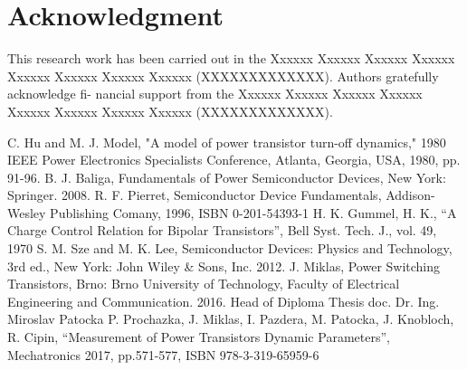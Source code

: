 \documentclass[conference]{IEEEtran}
\begin{document}


\section*{Acknowledgment}
This research work has been carried out in the Xxxxxx
Xxxxxx Xxxxxx Xxxxxx Xxxxxx Xxxxxx Xxxxxx Xxxxxx
(XXXXXXXXXXXXX). Authors gratefully acknowledge fi-
nancial support from the Xxxxxx Xxxxxx Xxxxxx Xxxxxx
Xxxxxx Xxxxxx Xxxxxx Xxxxxx (XXXXXXXXXXXXX).


\begin{thebibliography}{00}
	 C. Hu and M. J. Model, "A model of power transistor turn-off dynamics," 1980 IEEE Power Electronics Specialists Conference, Atlanta, Georgia, USA, 1980, pp. 91-96.
	 B. J. Baliga, Fundamentals of Power Semiconductor Devices, New York: Springer. 2008.
	 R. F. Pierret, {Semiconductor Device Fundamentals}, Addison-Wesley Publishing Comany, 1996, ISBN 0-201-54393-1
	 H. K. Gummel, H. K., ``A Charge Control Relation for Bipolar Transistors'', Bell Syst. Tech. J., vol. 49, 1970
	 S. M. Sze and M. K. Lee, Semiconductor Devices: Physics and Technology, 3rd ed., New York: John Wiley \& Sons, Inc. 2012.
	 J. Miklas, {Power Switching Transistors}, Brno: Brno University of Technology, Faculty of Electrical Engineering and Communication. 2016. Head of Diploma Thesis doc. Dr. Ing. Miroslav Patocka
	 P. Prochazka, J. Miklas, I. Pazdera, M. Patocka, J. Knobloch, R. Cipin, ``Measurement of Power Transistors Dynamic Parameters'', Mechatronics 2017, pp.571-577, ISBN 978-3-319-65959-6



\end{thebibliography}
\end{document}
